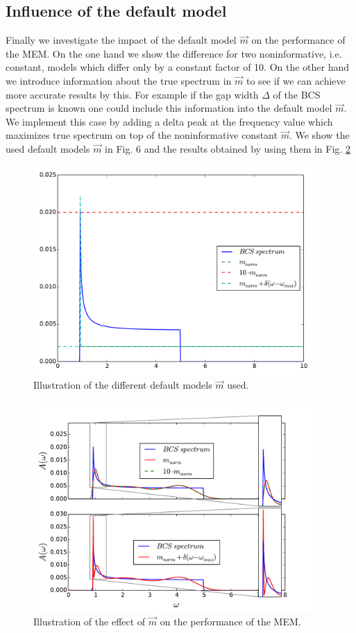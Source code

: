 \subsection*{Influence of the default model}
Finally we investigate the impact of the default model $\vec m$ on the performance of the MEM. On the one hand we show the difference for two noninformative, i.e. constant, models which differ only by a constant factor of 10. On the other hand we introduce information about the true spectrum in $\vec m$ to see if we can achieve more accurate results by this. For example if the gap width $\Delta$ of the BCS spectrum is known one could include this information into the default model $\vec m$. We implement this case by adding a delta peak at the frequency value which maximizes true spectrum on top of the noninformative constant $\vec m$. We show the used default models $\vec m$ in Fig. 6 and the results obtained by using them in Fig. \ref{results:fig_7}
\begin{figure}[htbp]
	\centering
	\includegraphics[width=0.95\textwidth]{./images/BCS_different_default_models.pdf}
	\caption{Illustration of the different default models $\vec m$ used.}
	\label{results:fig_6}
\end{figure}
\FloatBarrier
\begin{figure}[htbp]
	\centering
	\includegraphics[width=0.95\textwidth]{./images/BCS_delta_peak_example.pdf}
	\caption{Illustration of the effect of $\vec m$ on the performance of the MEM.}
	\label{results:fig_7}
\end{figure}
